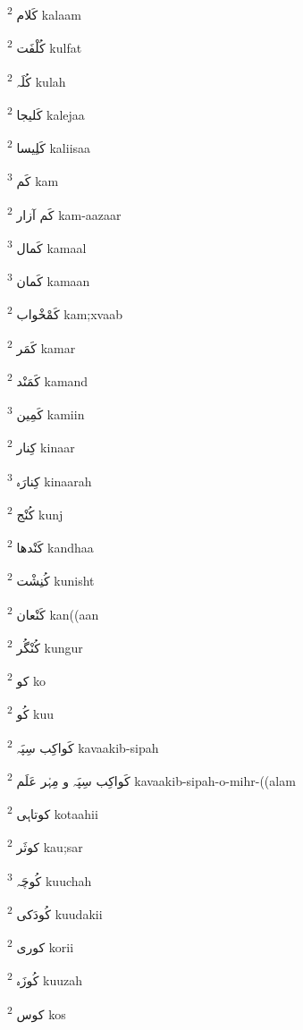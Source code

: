 \documentclass[12pt]{article}
\begin{document}
\begin{multicols}{5}
{\ur کَلام}   \textsuperscript{2} kalaam

{\ur کُلْفَت}   \textsuperscript{2} kulfat

{\ur کُلَہ}   \textsuperscript{2} kulah

{\ur کَلیجا}   \textsuperscript{2} kalejaa

{\ur کَلِیسا}   \textsuperscript{2} kaliisaa

{\ur کَم}   \textsuperscript{3} kam

{\ur کَم آزار}   \textsuperscript{2} kam-aazaar

{\ur کَمال}   \textsuperscript{3} kamaal

{\ur کَمان}   \textsuperscript{3} kamaan

{\ur کَمْخْواب}   \textsuperscript{2} kam;xvaab

{\ur کَمَر}   \textsuperscript{2} kamar

{\ur کَمَنْد}   \textsuperscript{2} kamand

{\ur کَمِین}   \textsuperscript{3} kamiin

{\ur کِنار}   \textsuperscript{2} kinaar

{\ur کِنارَہ}   \textsuperscript{3} kinaarah

{\ur کُنْج}   \textsuperscript{2} kunj

{\ur کَنْدھا}   \textsuperscript{2} kandhaa

{\ur کُنِشْت}   \textsuperscript{2} kunisht

{\ur کَنْعان}   \textsuperscript{2} kan((aan

{\ur کُنْگُر}   \textsuperscript{2} kungur

{\ur کو}   \textsuperscript{2} ko

{\ur کُو}   \textsuperscript{2} kuu

{\ur کَواکِب سِپَہ}   \textsuperscript{2} kavaakib-sipah

{\ur کَواکِب سِپَہ و مِہْر عَلَم}   \textsuperscript{2} kavaakib-sipah-o-mihr-((alam

{\ur کوتاہی}   \textsuperscript{2} kotaahii

{\ur کوثَر}   \textsuperscript{2} kau;sar

{\ur کُوچَہ}   \textsuperscript{3} kuuchah

{\ur کُودَکی}   \textsuperscript{2} kuudakii

{\ur کوری}   \textsuperscript{2} korii

{\ur کُوزَہ}   \textsuperscript{2} kuuzah

{\ur کوس}   \textsuperscript{2} kos


\end{multicols}
\end{document}
